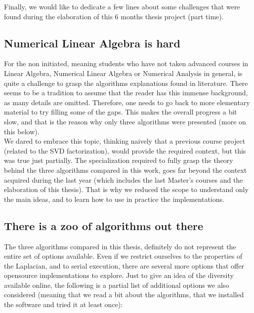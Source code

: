 Finally, we would like to dedicate a few lines about some challenges
that were found during the elaboration of this 6 months thesis
project (part time).

\subsection{Numerical Linear Algebra is hard}

For the non initiated, meaning students who have not taken advanced
courses in Linear Algebra,  Numerical Linear Algebra or Numerical
Analysis in general, is quite a challenge to grasp the algorithms
explanations found in literature. There seems to be a tradition to
assume that the reader has this immense background, as many details
are omitted. Therefore, one needs to go back to more elementary
material to try filling some of the gaps. This makes the overall
progress a bit slow, and that is the reason why only three algorithms
were presented (more on this below). \\

We dared to embrace this topic, thinking naively that a previous
course project (related to the SVD factorization), would provide
the required context, but this was 
true just partially. The specialization required to fully grasp the
theory behind the three algorithms compared in this work, goes far beyond
the context acquired during the last year (which includes the last
Master's courses and the elaboration of this thesis). That is why we
reduced the scope to understand only the main ideas, and to learn how
to use in practice the implementations.


\subsection{There is a zoo of algorithms out there}

The three algorithms compared in this thesis, definitely do not represent
the entire set of options available. Even if we restrict ourselves to
the properties of the \gls{Laplacian}, and to serial execution, there are
several more options that offer opensource implementations to
explore. Just to give an idea of the diversity available online, the
following is a partial list of additional options we also considered
(meaning that we read a bit about the algorithms, that we installed
the software and tried it at least once):

